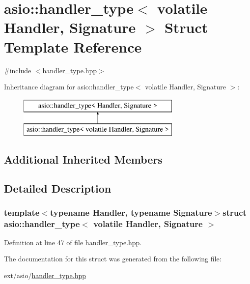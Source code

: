 \hypertarget{structasio_1_1handler__type_3_01volatile_01_handler_00_01_signature_01_4}{}\section{asio\+:\+:handler\+\_\+type$<$ volatile Handler, Signature $>$ Struct Template Reference}
\label{structasio_1_1handler__type_3_01volatile_01_handler_00_01_signature_01_4}


{\ttfamily \#include $<$handler\+\_\+type.\+hpp$>$}

Inheritance diagram for asio\+:\+:handler\+\_\+type$<$ volatile Handler, Signature $>$\+:\begin{figure}[H]
\begin{center}
\leavevmode
\includegraphics[height=2.000000cm]{structasio_1_1handler__type_3_01volatile_01_handler_00_01_signature_01_4}
\end{center}
\end{figure}
\subsection*{Additional Inherited Members}


\subsection{Detailed Description}
\subsubsection*{template$<$typename Handler, typename Signature$>$struct asio\+::handler\+\_\+type$<$ volatile Handler, Signature $>$}



Definition at line 47 of file handler\+\_\+type.\+hpp.



The documentation for this struct was generated from the following file\+:\begin{DoxyCompactItemize}
\item 
ext/asio/\hyperlink{handler__type_8hpp}{handler\+\_\+type.\+hpp}\end{DoxyCompactItemize}
